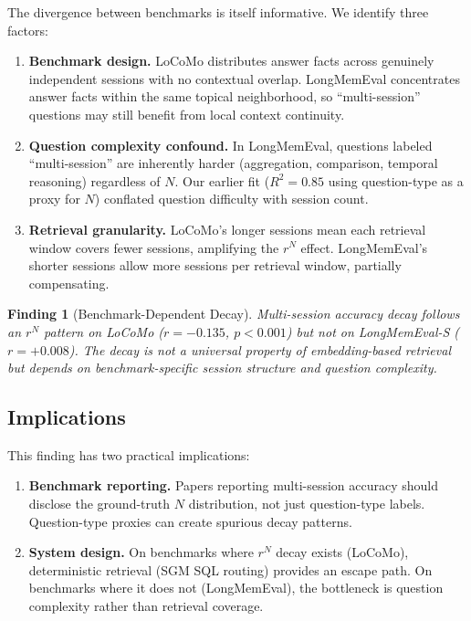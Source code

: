 \documentclass{article}
\newtheorem{finding}{Finding}
\begin{document}
The divergence between benchmarks is itself informative. We identify three factors:

\begin{enumerate}
\item \textbf{Benchmark design.} LoCoMo distributes answer facts across genuinely independent sessions with no contextual overlap. LongMemEval concentrates answer facts within the same topical neighborhood, so ``multi-session'' questions may still benefit from local context continuity.
\item \textbf{Question complexity confound.} In LongMemEval, questions labeled ``multi-session'' are inherently harder (aggregation, comparison, temporal reasoning) regardless of $N$. Our earlier fit ($R^2 = 0.85$ using question-type as a proxy for $N$) conflated question difficulty with session count.
\item \textbf{Retrieval granularity.} LoCoMo's longer sessions mean each retrieval window covers fewer sessions, amplifying the $r^N$ effect. LongMemEval's shorter sessions allow more sessions per retrieval window, partially compensating.
\end{enumerate}

\begin{finding}[Benchmark-Dependent Decay]
Multi-session accuracy decay follows an $r^N$ pattern on LoCoMo ($r = -0.135$, $p < 0.001$) but not on LongMemEval-S ($r = +0.008$). The decay is not a universal property of embedding-based retrieval but depends on benchmark-specific session structure and question complexity.
\end{finding}

\subsection{Implications}

This finding has two practical implications:

\begin{enumerate}
\item \textbf{Benchmark reporting.} Papers reporting multi-session accuracy should disclose the ground-truth $N$ distribution, not just question-type labels. Question-type proxies can create spurious decay patterns.
\item \textbf{System design.} On benchmarks where $r^N$ decay exists (LoCoMo), deterministic retrieval (SGM SQL routing) provides an escape path. On benchmarks where it does not (LongMemEval), the bottleneck is question complexity rather than retrieval coverage.
\end{enumerate}
\end{document}
